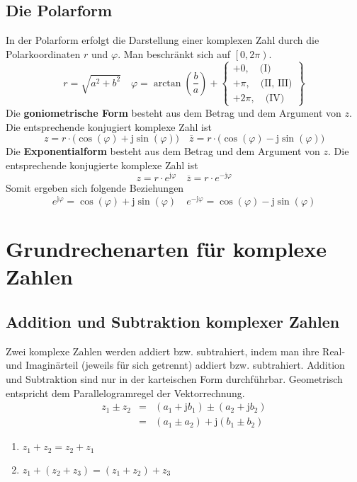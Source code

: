 \subsection{Die Polarform}
In der Polarform erfolgt die Darstellung einer komplexen Zahl durch die Polarkoordinaten $r$ und $\varphi$. Man beschränkt sich auf $\left[0,2\pi\right)$.
\begin{equation}
\boxed{r=\sqrt{a^2+b^2}}\quad \boxed{\varphi=\arctan\left(\dfrac{b}{a}\right)+\left\{\begin{array}{l}+0,\quad \text{(I)}\\+\pi,\quad \text{(II, III)}\\+2\pi,\quad \text{(IV)}\end{array}\right\}}
\end{equation}
Die \textbf{goniometrische Form} besteht aus dem Betrag und dem Argument von $z$. Die entsprechende konjugiert komplexe Zahl ist
\begin{equation}
\boxed{z=r\cdot \Big(\cos\left(\varphi\right)+\text{j}\sin\left(\varphi\right)\Big)}\quad 
\boxed{\overline{z}=r\cdot \Big(\cos\left(\varphi\right)-\text{j}\sin\left(\varphi\right)\Big)}
\end{equation}
Die \textbf{Exponentialform} besteht aus dem Betrag und dem Argument von $z$. Die entsprechende konjugierte komplexe Zahl ist
\begin{equation}
\boxed{z=r\cdot e^{\text{j}\varphi}}\quad
\boxed{\overline{z}=r\cdot e^{-\text{j}\varphi}}
\end{equation}
Somit ergeben sich folgende Beziehungen
\begin{equation}
\boxed{e^{\text{j}\varphi}=\cos\left(\varphi\right)+\text{j}\sin\left(\varphi\right)}\quad \boxed{e^{-\text{j}\varphi}=\cos\left(\varphi\right)-\text{j}\sin\left(\varphi\right)}
\end{equation}
\section{Grundrechenarten für komplexe Zahlen}
\subsection{Addition und Subtraktion komplexer Zahlen}
Zwei komplexe Zahlen werden addiert bzw. subtrahiert, indem man ihre Real- und Imaginärteil (jeweils für sich getrennt) addiert bzw. subtrahiert. Addition und Subtraktion sind nur in der karteischen Form durchführbar. Geometrisch entspricht dem Parallelogramregel der Vektorrechnung.  
\begin{equation}
\boxed{\begin{array}{lll}
z_1\pm z_2&=&\left(a_1+ \text{j}b_1\right)\pm \left(a_2+ \text{j}b_2\right)\\
&=&\left(a_1\pm a_2\right)+\text{j}\left(b_1\pm b_2\right)
\end{array}}
\end{equation}
\begin{enumerate}[$(i)$]
\item $z_1+z_2=z_2+z_1$
\item $z_1+\left(z_2+z_3\right)=\left(z_1+z_2\right)+z_3$
\end{enumerate}
